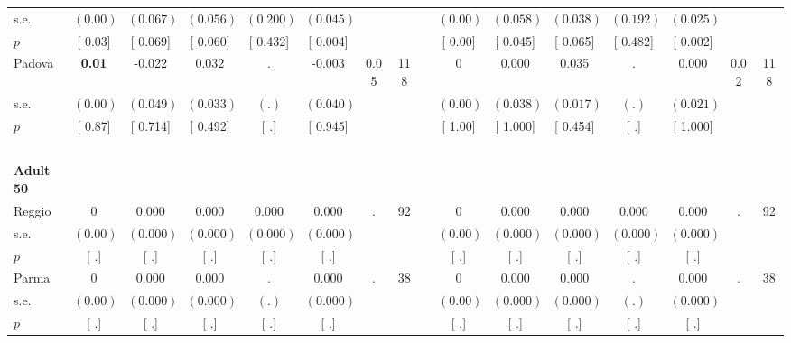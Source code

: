 \begin{longtable}{L{8em} c c c c c c c p{1em} c c c c c c c}
\quad \quad \quad \quad s.e.& $ (     0.00)$ & $ (    0.067)$ & $ (    0.056)$ & $ (    0.200)$ & $ (    0.045)$ & & & & $ (     0.00)$ & $ (    0.058)$ & $ (    0.038)$ & $ (    0.192)$ & $ (    0.025)$ & &  \\*
\quad \quad \quad \quad $ p$ & [     0.03] & [    0.069] & [    0.060] & [    0.432] & [    0.004] & & & & [     0.00] & [    0.045] & [    0.065] & [    0.482] & [    0.002] & &  \\[1em]
\quad \quad \quad Padova& \textbf{     0.01} &    -0.022 &     0.032 &         . &    -0.003 &      0.05 &       118 & & 0 &     0.000 &     0.035 &         . &     0.000 &      0.02 &       118  \\*
\quad \quad \quad \quad s.e.& $ (     0.00)$ & $ (    0.049)$ & $ (    0.033)$ & $ (        .)$ & $ (    0.040)$ & & & & $ (     0.00)$ & $ (    0.038)$ & $ (    0.017)$ & $ (        .)$ & $ (    0.021)$ & &  \\*
\quad \quad \quad \quad $ p$ & [     0.87] & [    0.714] & [    0.492] & [        .] & [    0.945] & & & & [     1.00] & [    1.000] & [    0.454] & [        .] & [    1.000] & &  \\[1em]
~\\[1em]
\quad \quad \textbf{Adult 50} & & & & & & & & & & & & & & & \\* 
\quad \quad \quad Reggio& 0 &     0.000 &     0.000 &     0.000 &     0.000 &         . &        92 & & 0 &     0.000 &     0.000 &     0.000 &     0.000 &         . &        92  \\*
\quad \quad \quad \quad s.e.& $ (     0.00)$ & $ (    0.000)$ & $ (    0.000)$ & $ (    0.000)$ & $ (    0.000)$ & & & & $ (     0.00)$ & $ (    0.000)$ & $ (    0.000)$ & $ (    0.000)$ & $ (    0.000)$ & &  \\*
\quad \quad \quad \quad $ p$ & [        .] & [        .] & [        .] & [        .] & [        .] & & & & [        .] & [        .] & [        .] & [        .] & [        .] & &  \\[1em]
\quad \quad \quad Parma& 0 &     0.000 &     0.000 &         . &     0.000 &         . &        38 & & 0 &     0.000 &     0.000 &         . &     0.000 &         . &        38  \\*
\quad \quad \quad \quad s.e.& $ (     0.00)$ & $ (    0.000)$ & $ (    0.000)$ & $ (        .)$ & $ (    0.000)$ & & & & $ (     0.00)$ & $ (    0.000)$ & $ (    0.000)$ & $ (        .)$ & $ (    0.000)$ & &  \\*
\quad \quad \quad \quad $ p$ & [        .] & [        .] & [        .] & [        .] & [        .] & & & & [        .] & [        .] & [        .] & [        .] & [        .] & &  \\[1em]

\end{longtable}
